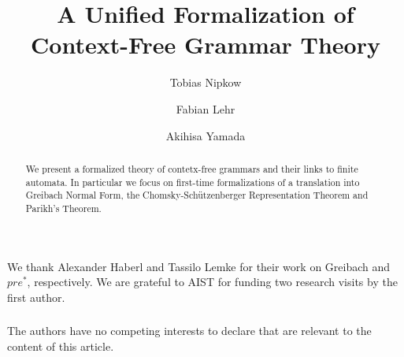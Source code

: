 \documentclass[runningheads]{llncs}
\newcommand{\prestar}{$\mathit{pre}^*$}
\begin{document}
\title{A Unified Formalization of Context-Free Grammar Theory}

\author{Tobias Nipkow \and
Fabian Lehr \and
Akihisa Yamada}
%


\maketitle

\begin{abstract}
We present a formalized theory of contetx-free grammars and
their links to finite automata. In particular we focus on first-time
formalizations of a translation into Greibach Normal Form, the Chomsky-Sch\"utzenberger Representation Theorem and Parikh's Theorem.

\end{abstract}


%



\begin{credits}
\subsubsection{\ackname}
We thank Alexander Haberl and Tassilo Lemke for their work on Greibach and \prestar, respectively.
We are grateful to AIST for funding two research visits by the first author.

\subsubsection{\discintname}
The authors have no competing interests to declare that are relevant to the content of this article.
\end{credits}



\end{document}
